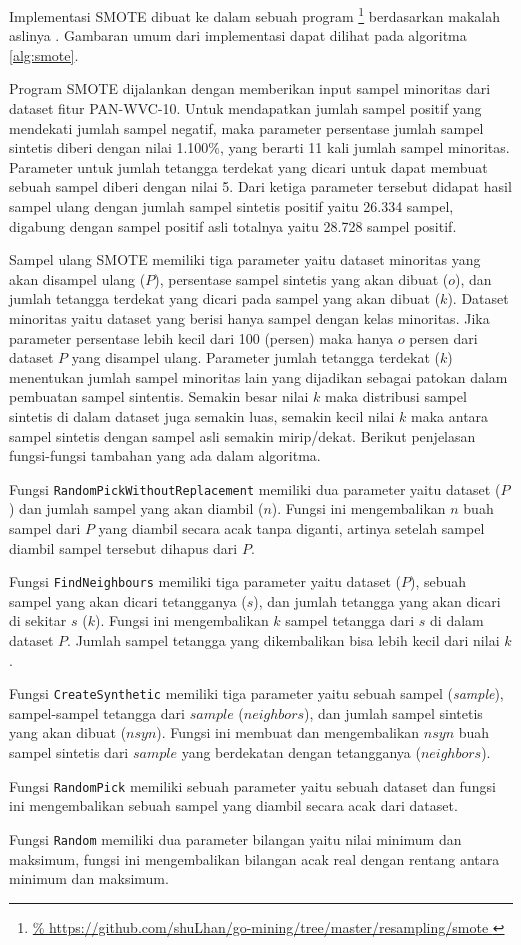 Implementasi SMOTE dibuat ke dalam sebuah program
\footnote{\url{%
https://github.com/shuLhan/go-mining/tree/master/resampling/smote
}}
berdasarkan makalah aslinya
\parencite{chawla2002smote}.
Gambaran umum dari implementasi dapat dilihat pada algoritma \ref{alg:smote}.

Program SMOTE dijalankan dengan memberikan input sampel minoritas dari dataset
fitur PAN-WVC-10.
Untuk mendapatkan jumlah sampel positif yang mendekati jumlah sampel negatif,
maka parameter persentase jumlah sampel sintetis diberi dengan nilai 1.100\%,
yang berarti 11 kali jumlah sampel minoritas.
Parameter untuk jumlah tetangga terdekat yang dicari untuk dapat membuat sebuah
sampel diberi dengan nilai 5.
Dari ketiga parameter tersebut didapat hasil sampel ulang dengan jumlah sampel
sintetis positif yaitu 26.334 sampel, digabung dengan sampel positif asli
totalnya yaitu 28.728 sampel positif.

	

Sampel ulang SMOTE memiliki tiga parameter yaitu dataset minoritas yang akan
disampel ulang ($P$), persentase sampel sintetis yang akan
dibuat ($o$), dan jumlah tetangga terdekat yang dicari pada sampel
yang akan dibuat ($k$).
Dataset minoritas yaitu dataset yang berisi hanya sampel dengan kelas
minoritas.
Jika parameter persentase lebih kecil dari 100 (persen) maka hanya $o$ persen
dari dataset $P$ yang disampel ulang.
Parameter jumlah tetangga terdekat ($k$) menentukan jumlah sampel minoritas
lain yang dijadikan sebagai patokan dalam pembuatan sampel sintentis.
Semakin besar nilai $k$ maka distribusi sampel sintetis di dalam dataset juga
semakin luas, semakin kecil nilai $k$ maka antara sampel sintetis
dengan sampel asli semakin mirip/dekat.
Berikut penjelasan fungsi-fungsi tambahan yang ada dalam algoritma.

Fungsi \texttt{RandomPickWithoutReplacement} memiliki dua parameter yaitu
dataset ($P$) dan jumlah sampel yang akan diambil ($n$).  Fungsi ini
mengembalikan $n$ buah sampel dari $P$ yang diambil secara acak tanpa diganti,
artinya setelah sampel diambil sampel tersebut dihapus dari $P$.

Fungsi \texttt{FindNeighbours} memiliki tiga parameter yaitu dataset ($P$),
sebuah sampel yang akan dicari tetangganya ($s$), dan jumlah tetangga yang akan
dicari di sekitar $s$ ($k$).
Fungsi ini mengembalikan $k$ sampel tetangga dari $s$ di dalam dataset $P$.
Jumlah sampel tetangga yang dikembalikan bisa lebih kecil dari nilai $k$.

Fungsi \texttt{CreateSynthetic} memiliki tiga parameter yaitu sebuah sampel
(\textit{sample}), sampel-sampel tetangga dari $sample$ ($neighbors$), dan
jumlah sampel sintetis yang akan dibuat ($nsyn$).
Fungsi ini membuat dan mengembalikan $nsyn$ buah sampel sintetis dari $sample$
yang berdekatan dengan tetangganya ($neighbors$).

Fungsi \texttt{RandomPick} memiliki sebuah parameter yaitu sebuah dataset dan
fungsi ini mengembalikan sebuah sampel yang diambil secara acak dari dataset.

Fungsi \texttt{Random} memiliki dua parameter bilangan yaitu nilai minimum dan
maksimum, fungsi ini mengembalikan bilangan acak real dengan rentang antara
minimum dan maksimum.
